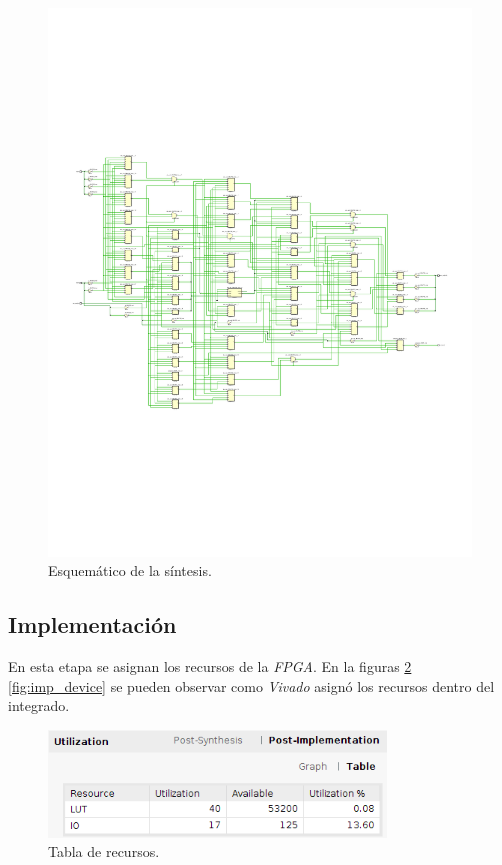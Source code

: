 \documentclass[
    11pt,
    spanish,
	a4paper
]{article}
\begin{document}
\begin{figure}
    \centering
    \includegraphics[width=\textwidth]{img/syn_schematic.pdf}
    \caption{Esquemático de la síntesis.}
    \label{fig:syn_sch}
\end{figure}

\subsection{Implementación}
\label{subsec:implementación}

En esta etapa se asignan los recursos de la \emph{FPGA}.
En la figuras \ref{fig:imp_table} \ref{fig:imp_device} se pueden observar como \emph{Vivado} asignó los recursos dentro del integrado.

\begin{figure}[h!]
    \centering
    \includegraphics[width=0.8\textwidth]{img/imp_table.png}
    \caption{Tabla de recursos.}
    \label{fig:imp_table}
\end{figure}
\end{document}
